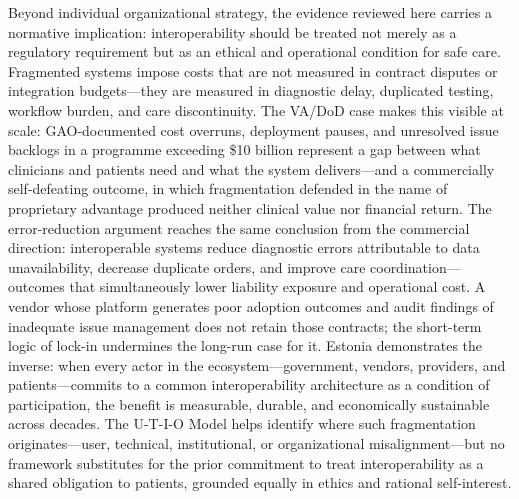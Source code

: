 Beyond individual organizational strategy, the evidence reviewed here carries a normative implication: interoperability should be treated not merely as a regulatory requirement but as an ethical and operational condition for safe care. Fragmented systems impose costs that are not measured in contract disputes or integration budgets—they are measured in diagnostic delay, duplicated testing, workflow burden, and care discontinuity. The VA/DoD case makes this visible at scale: GAO-documented cost overruns, deployment pauses, and unresolved issue backlogs in a programme exceeding \$10 billion represent a gap between what clinicians and patients need and what the system delivers—and a commercially self-defeating outcome, in which fragmentation defended in the name of proprietary advantage produced neither clinical value nor financial return. The error-reduction argument reaches the same conclusion from the commercial direction: interoperable systems reduce diagnostic errors attributable to data unavailability, decrease duplicate orders, and improve care coordination—outcomes that simultaneously lower liability exposure and operational cost. A vendor whose platform generates poor adoption outcomes and audit findings of inadequate issue management does not retain those contracts; the short-term logic of lock-in undermines the long-run case for it. Estonia demonstrates the inverse: when every actor in the ecosystem—government, vendors, providers, and patients—commits to a common interoperability architecture as a condition of participation, the benefit is measurable, durable, and economically sustainable across decades. The U-T-I-O Model helps identify where such fragmentation originates—user, technical, institutional, or organizational misalignment—but no framework substitutes for the prior commitment to treat interoperability as a shared obligation to patients, grounded equally in ethics and rational self-interest.

